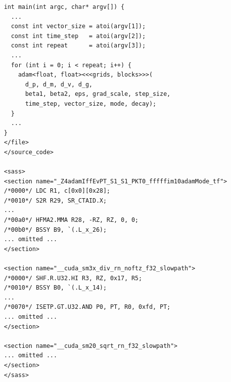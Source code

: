 \begin{lstlisting}[style=appendixxml,caption={Example XML-style human prompt used for static analysis (compacted for appendix display).},label={lst:appendix-human-prompt}]
int main(int argc, char* argv[]) {
  ...
  const int vector_size = atoi(argv[1]);
  const int time_step   = atoi(argv[2]);
  const int repeat      = atoi(argv[3]);
  ...
  for (int i = 0; i < repeat; i++) {
    adam<float, float><<<grids, blocks>>>(
      d_p, d_m, d_v, d_g,
      beta1, beta2, eps, grad_scale, step_size,
      time_step, vector_size, mode, decay);
  }
  ...
}
</file>
</source_code>

<sass>
<section name="_Z4adamIffEvPT_S1_S1_PKT0_fffffim10adamMode_tf">
/*0000*/ LDC R1, c[0x0][0x28];
/*0010*/ S2R R29, SR_CTAID.X;
...
/*00a0*/ HFMA2.MMA R28, -RZ, RZ, 0, 0;
/*00b0*/ BSSY B9, `(.L_x_26);
... omitted ...
</section>

<section name="__cuda_sm3x_div_rn_noftz_f32_slowpath">
/*0000*/ SHF.R.U32.HI R3, RZ, 0x17, R5;
/*0010*/ BSSY B0, `(.L_x_14);
...
/*0070*/ ISETP.GT.U32.AND P0, PT, R0, 0xfd, PT;
... omitted ...
</section>

<section name="__cuda_sm20_sqrt_rn_f32_slowpath">
... omitted ...
</section>
</sass>
\end{lstlisting}

